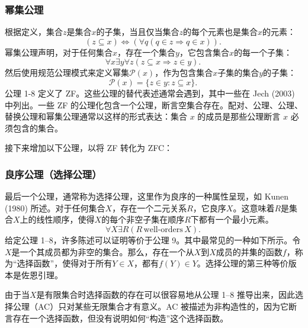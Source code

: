 \subsubsection{幂集公理} 
根据定义，集合\( z \)是集合\( x \)的子集，当且仅当集合\( z \)的每个元素也是集合\( x \)的元素：
\[
(z \subseteq x) \Leftrightarrow (\forall q (q \in z \Rightarrow q \in x)).~
\]
幂集公理声明，对于任何集合\( x \)，存在一个集合\( y \)，它包含集合\( x \)的每一个子集：
\[
\forall x \exists y \forall z (z \subseteq x \Rightarrow z \in y).~
\]
然后使用规范公理模式来定义幂集\( \mathcal{P}(x) \)，作为包含集合\( x \)子集的集合\( y \)的子集：
\[
\mathcal{P}(x) = \{ z \in y : z \subseteq x \}.~
\]
公理 1-8 定义了 ZF。这些公理的替代表述通常会遇到，其中一些在 Jech (2003) 中列出。一些 ZF 的公理化包含一个公理，断言空集合存在。配对、公理、公理、替换公理和幂集公理通常以这样的形式表达：集合 \( x \) 的成员是那些公理断言 \( x \) 必须包含的集合。

接下来增加以下公理，以将 ZF 转化为 ZFC：
\subsubsection{良序公理（选择公理）} 
最后一个公理，通常称为选择公理，这里作为良序的一种属性呈现，如 Kunen (1980) 所述。对于任何集合\( X \)，存在一个二元关系\( R \)，它良序\( X \)。这意味着\( R \)是集合\( X \)上的线性顺序，使得\( X \)的每个非空子集在顺序\( R \)下都有一个最小元素。
\[
\forall X \exists R (R \, \text{well-orders} \, X).~
\]
给定公理 1–8，许多陈述可以证明等价于公理 9。其中最常见的一种如下所示。令\( X \)是一个其成员都为非空的集合。那么，存在一个从\( X \)到\( X \)成员的并集的函数\( f \)，称为“选择函数”，使得对于所有\( Y \in X \)，都有\( f(Y) \in Y \)。选择公理的第三种等价版本是佐恩引理。

由于当\( X \)是有限集合时选择函数的存在可以很容易地从公理 1–8 推导出来，因此选择公理（AC）只对某些无限集合才有意义。AC 被描述为非构造性的，因为它断言存在一个选择函数，但没有说明如何“构造”这个选择函数。